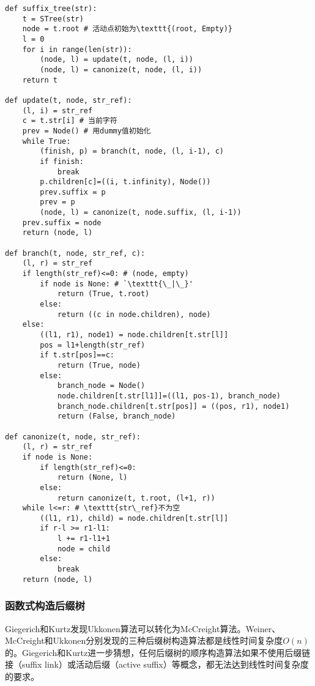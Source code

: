 \documentclass[UTF8]{article}
\begin{document}
\lstset{escapeinside=`'}
\begin{lstlisting}
def suffix_tree(str):
    t = STree(str)
    node = t.root # 活动点初始为\texttt{(root, Empty)}
    l = 0
    for i in range(len(str)):
        (node, l) = update(t, node, (l, i))
        (node, l) = canonize(t, node, (l, i))
    return t

def update(t, node, str_ref):
    (l, i) = str_ref
    c = t.str[i] # 当前字符
    prev = Node() # 用dummy值初始化
    while True:
        (finish, p) = branch(t, node, (l, i-1), c)
        if finish:
            break
        p.children[c]=((i, t.infinity), Node())
        prev.suffix = p
        prev = p
        (node, l) = canonize(t, node.suffix, (l, i-1))
    prev.suffix = node
    return (node, l)

def branch(t, node, str_ref, c):
    (l, r) = str_ref
    if length(str_ref)<=0: # (node, empty)
        if node is None: # `\texttt{\_|\_}'
            return (True, t.root)
        else:
            return ((c in node.children), node)
    else:
        ((l1, r1), node1) = node.children[t.str[l]]
        pos = l1+length(str_ref)
        if t.str[pos]==c:
            return (True, node)
        else:
            branch_node = Node()
            node.children[t.str[l1]]=((l1, pos-1), branch_node)
            branch_node.children[t.str[pos]] = ((pos, r1), node1)
            return (False, branch_node)

def canonize(t, node, str_ref):
    (l, r) = str_ref
    if node is None:
        if length(str_ref)<=0:
            return (None, l)
        else:
            return canonize(t, t.root, (l+1, r))
    while l<=r: # \texttt{str\_ref}不为空
        ((l1, r1), child) = node.children[t.str[l]]
        if r-l >= r1-l1:
            l += r1-l1+1
            node = child
        else:
            break
    return (node, l)
\end{lstlisting}
\lstset{escapeinside=,}

\subsubsection{函数式构造后缀树}

Giegerich和Kurtz发现Ukkonen算法可以转化为McCreight算法\cite{GieKur97}。Weiner、McCreight和Ukkonen分别发现的三种后缀树构造算法都是线性时间复杂度$O(n)$的。Giegerich和Kurtz进一步猜想，任何后缀树的顺序构造算法如果不使用后缀链接（suffix link）或活动后缀（active suffix）等概念，都无法达到线性时间复杂度的要求。
\end{document}
